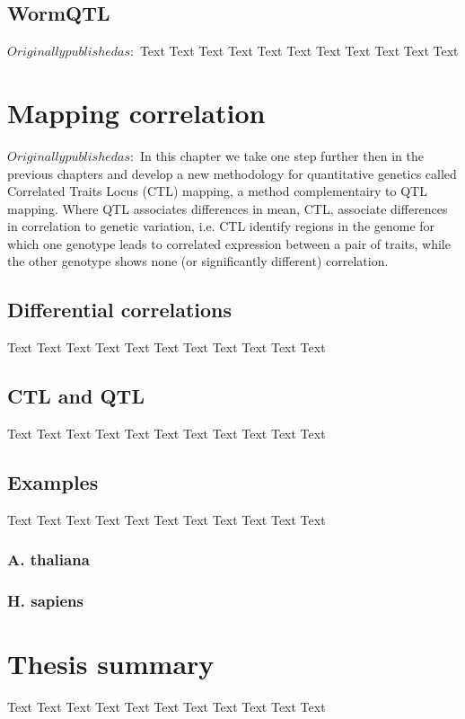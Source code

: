 \documentclass[11pt, twoside, a5paper]{report}
\begin{document}
\section{WormQTL}
$ Originally published as: $
Text Text Text Text Text Text Text Text Text Text Text

\chapter{Mapping correlation}
$ Originally published as: $
In this chapter we take one step further then in the previous chapters and develop a new methodology for
quantitative genetics called Correlated Traits Locus (CTL) mapping, a method complementairy to QTL mapping. 
Where QTL associates differences in mean, CTL, associate differences in correlation to genetic variation, i.e. 
CTL identify regions in the genome for which one genotype leads to correlated expression between a pair of 
traits, while the other genotype shows none (or significantly different) correlation. 

\section{Differential correlations}
Text Text Text Text Text Text Text Text Text Text Text

\section{CTL and QTL}
Text Text Text Text Text Text Text Text Text Text Text

\section{Examples}
Text Text Text Text Text Text Text Text Text Text Text
\subsection{A. thaliana}

\subsection{H. sapiens}

\chapter{Thesis summary}
Text Text Text Text Text Text Text Text Text Text Text
\end{document}
